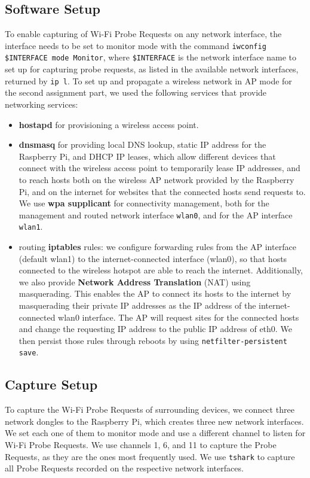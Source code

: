 \documentclass[sigconf,nonacm]{acmart}
\begin{document}
\subsection{Software Setup}
\label{sec:software_setup}
To enable capturing of Wi-Fi Probe Requests on any network interface, the interface needs to be set to monitor mode with the command \verb|iwconfig $INTERFACE mode Monitor|, where \verb |$INTERFACE| is the network interface name to set up for capturing probe requests, as listed in the available network interfaces, returned by \verb|ip l|.
To set up and propagate a wireless network in AP mode for the second assignment part, we used the following services that provide networking services:
\begin{itemize}
\item \textbf{hostapd} for provisioning a wireless access point.
\item \textbf{dnsmasq} for providing local DNS lookup, static IP address for the Raspberry Pi, and DHCP IP leases, which allow different devices that connect with the wireless access point to temporarily lease IP addresses, and to reach hosts both on the wireless AP network provided by the Raspberry Pi, and on the internet for websites that the connected hosts send requests to. We use \textbf{wpa supplicant} for connectivity management, both for the management and routed network interface \verb|wlan0|, and for the AP interface \verb|wlan1|.
\item routing \textbf{iptables} rules: we configure forwarding rules from the AP interface (default wlan1) to the internet-connected interface (wlan0), so that hosts connected to the wireless hotspot are able to reach the internet. Additionally, we also provide \textbf{Network Address Translation} (NAT) using masquerading. This enables the AP to connect its hosts to the internet by masquerading their private IP addresses as the IP address of the internet-connected wlan0 interface. The AP will request sites for the connected hosts and change the requesting IP address to the public IP address of eth0. We then persist those rules through reboots by using \verb|netfilter-persistent save|.
\end{itemize}

\subsection{Capture Setup}
\label{sec:capture_setup}
To capture the Wi-Fi Probe Requests of surrounding devices, we connect three network dongles to the Raspberry Pi, which creates three new network interfaces. We set each one of them to monitor mode and use a different channel to listen for Wi-Fi Probe Requests. We use channels 1, 6, and 11 to capture the Probe Requests, as they are the ones most frequently used. We use \verb|tshark| to capture all Probe Requests recorded on the respective network interfaces.
\end{document}
